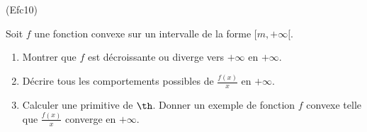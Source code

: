 \begin{tiny}(Efc10)\end{tiny}
Soit $f$ une fonction convexe sur un intervalle de la forme $[m,+\infty[$.
\begin{enumerate}
 \item Montrer que $f$ est décroissante ou diverge vers $+\infty$ en $+\infty$.
 \item Décrire tous les comportements possibles de $\frac{f(x)}{x}$ en $+\infty$.
 \item Calculer une primitive de $\th $. Donner un exemple de fonction $f$ convexe telle que $\frac{f(x)}{x}$ converge en $+\infty$.
\end{enumerate}
